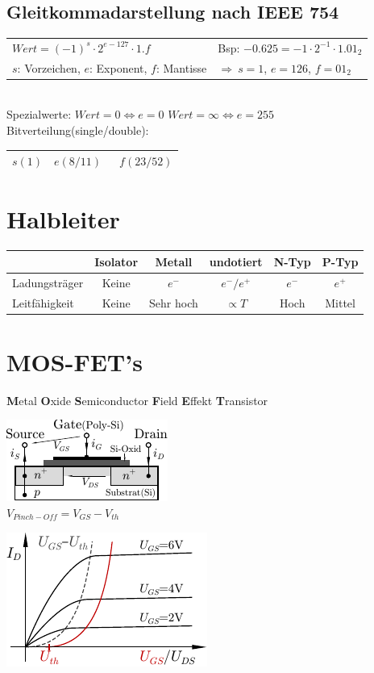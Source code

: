 \documentclass[6pt,a4paper]{scrartcl}
\newcommand{\Ra}[0]{\ensuremath{\Rightarrow}}									%
\begin{document}
\begin{multicols}{3}
	\subsection{Gleitkommadarstellung nach IEEE 754}
	\begin{tabular}{l|l}
		$Wert = (-1)^s \cdot 2^{e-127} \cdot 1.f$ & Bsp: $-0.625 = -1 \cdot 2^{-1} \cdot 1.01_2$\\
		$s$: Vorzeichen, $e$: Exponent, $f$: Mantisse & $\Ra\ s = 1$, $e = 126$, $f = 01_2$\\ 
	\end{tabular}
	\\[0.5em]
	Spezialwerte: $Wert = 0 \Leftrightarrow e=0$ \qquad $Wert = \infty \Leftrightarrow e=255$ \\
	Bitverteilung(single/double):\\
	\begin{tabular}{|c|c|c|} \hline 
		$s(1)$ & \quad $e(8/11)$ \quad\qquad & \qquad\qquad\qquad\ $f(23/52)$ \qquad\qquad\qquad\qquad \\ \hline
	\end{tabular}

\section{Halbleiter}
\begin{tabular}{l|c|c|c|c|c}
	& Isolator & Metall & undotiert & N-Typ & P-Typ \\ \hline
	Ladungsträger & Keine & $e^-$ & $e^- / e^+$ & $e^-$ & $e^+$ \\
	Leitfähigkeit & Keine & Sehr hoch & $\propto T$ & Hoch & Mittel\\  
\end{tabular}


\section{MOS-FET's}
\textbf{M}etal \textbf{O}xide \textbf{S}emiconductor \textbf{F}ield \textbf{E}ffekt \textbf{T}ransistor\\
\parbox{4.0cm}{ \includegraphics{img/ds/mosfet.pdf} \\ $V_{Pinch-Off} = V_{GS} - V_{th}$ } \parbox{3.0cm}{ \includegraphics{img/ds/char_nmos.pdf} } 



\end{multicols}
\end{document}
